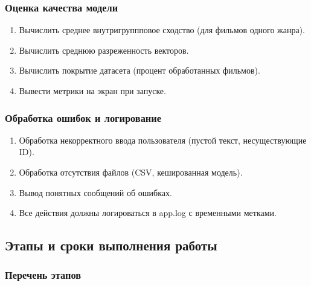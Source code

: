 \subsubsection*{Оценка качества модели}

\begin{enumerate}
    \item Вычислить среднее внутригруппповое сходство (для фильмов одного жанра).
    \item Вычислить среднюю разреженность векторов.
    \item Вычислить покрытие датасета (процент обработанных фильмов).
    \item Вывести метрики на экран при запуске.
\end{enumerate}

\subsubsection*{Обработка ошибок и логирование}

\begin{enumerate}
    \item Обработка некорректного ввода пользователя (пустой текст, несуществующие ID).
    \item Обработка отсутствия файлов (CSV, кешированная модель).
    \item Вывод понятных сообщений об ошибках.
    \item Все действия должны логироваться в app.log с временными метками.
\end{enumerate}

\subsection{Этапы и сроки выполнения работы}

\subsubsection{Перечень этапов}

